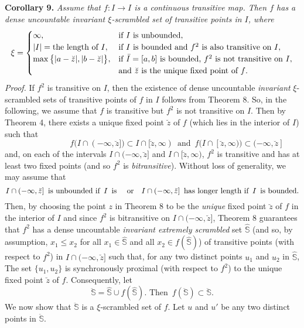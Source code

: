 \documentclass[12pt]{article}
\begin{document}
\noindent
{\bf Corollary 9.}
{\it Assume that $f : I \longrightarrow I$ is a continuous transitive map.  Then $f$ has a dense uncountable {\it invariant} $\xi$-scrambled set of transitive points in $I$, where
$$
\xi =  \begin{cases}
               \infty, & \text{if $I$ is unbounded}, \cr
               |I| = \text{the length of $I$}, & \text{if $I$ is bounded and $f^2$ is also transitive on $I$}, \cr
               \max \big\{|a-\breve z|, |b-\breve z|\big\}, & \text{if $\bar I = [a, b]$ is bounded, $f^2$ is not transitive on $I$}, \cr
                & \text{and $\breve z$ is the unique fixed point of $f$}. \cr
       \end{cases}
$$}
\noindent
{\it Proof.}
If $f^2$ is transitive on $I$, then the existence of dense uncountable {\it invariant} $\xi$-scrambled sets of transitive points of $f$ in $I$ follows from Theorem 8.  So, in the following, we assume that $f$ is transitive but $f^2$ is not transitive on $I$.  Then by Theorem 4, there exists a unique fixed point $\breve z$ of $f$ (which lies in the interior of $I$) such that 
$$
\qquad\qquad\qquad f\bigl(I \cap (-\infty, \breve z]\bigr) \subset I \cap [\breve z, \infty) \,\,\, \text{and} \,\,\, f\bigl(I \cap [\breve z, \infty)\bigr) \subset (-\infty, \breve z]
$$ 
and, on each of the intervals $I \cap (-\infty, \breve z]$ and $I \cap [\breve z, \infty)$, $f^2$ is transitive and has at least two fixed points (and so $f^2$ is {\it bitransitive}).  Without loss of generality, we may assume that 
$$
I \cap (-\infty, \breve z] \,\,\, \text{is unbounded if} \,\,\, I \,\,\, \text{is \quad or} \quad I \cap (-\infty, \breve z] \,\,\, \text{has longer length if} \,\,\, I \,\,\, \text{is bounded}.
$$  
Then, by choosing the point $z$ in Theorem 8 to be the {\it unique} fixed point $\breve z$ of $f$ in the interior of $I$ and since $f^2$ is bitransitive on $I \cap (-\infty, \breve z]$, Theorem 8 guarantees that $f^2$ has a dense uncountable {\it invariant extremely scrambled} set $\widehat {\mathbb S}$ \big(and so, by assumption, $x_1 \le x_2$ for all $x_1 \in \widehat {\mathbb S}$ and all $x_2 \in f(\widehat {\mathbb S})$\big) of transitive points (with respect to $f^2$) in $I \cap (-\infty, \breve z]$ such that, for any two distinct points $u_1$ and $u_2$ in $\widehat {\mathbb S}$, The set $\{ u_1, u_2 \}$ is synchronously proximal (with respect to $f^2$) to the unique fixed point $\breve z$ of $f$.  Consequently, let 
$$
\ddot{\mathbb S} = \widehat {\mathbb S} \cup f(\widehat {\mathbb S}). \,\, \text{Then} \,\,\, f(\ddot{\mathbb S}) \subset \ddot{\mathbb S}.
$$
We now show that $\ddot{\mathbb S}$ is a $\xi$-scrambled set of $f$.  Let $u$ and $u'$ be any two distinct points in $\ddot{\mathbb S}$.
\end{document}
